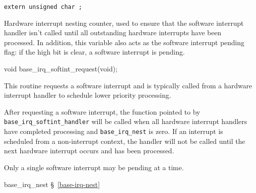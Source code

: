 \label{base-irq-nest}
\begin{apisyn}

	{\tt extern unsigned char ;}
\end{apisyn}
\begin{apidesc}
	Hardware interrupt nesting counter,
	used to ensure that the software interrupt handler isn't called
	until all outstanding hardware interrupts have been processed.
	In addition, this variable also acts as the software interrupt
	pending flag:
	if the high bit is clear, a software interrupt is pending.
\end{apidesc}

\label{base-irq-softint-request}
\begin{apisyn}

	\funcproto void base_irq_softint_request(void);
\end{apisyn}
\begin{apidesc}
	This routine requests a software interrupt and is typically
	called from a hardware interrupt handler to schedule
	lower priority processing.

	After requesting a software interrupt, the function pointed to by
	{\tt base_irq_softint_handler} will be called when all hardware
	interrupt handlers have completed processing and
	{\tt base_irq_nest} is zero.
	If an interrupt is scheduled from a non-interrupt context,
	the handler will not be called until the next hardware interrupt
	occurs and has been processed.

	Only a single software interrupt may be pending at a time.
\end{apidesc}
\begin{apidep}
	\item[base_irq_nest]	\S~\ref{base-irq-nest}
\end{apidep}

